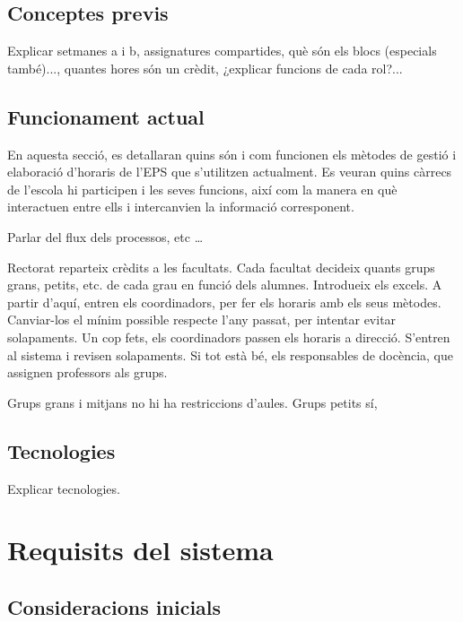 \documentclass[a4paper,12pt]{ThesisStyle}
\begin{document}
\section{Conceptes previs}
\label{sec:conceptes_previs}
Explicar setmanes a i b, assignatures compartides, què són els blocs (especials també)..., quantes hores
són un crèdit, ¿explicar funcions de cada rol?...

\section{Funcionament actual}
\label{sec:funcionament_actual}

En aquesta secció, es detallaran quins són i com funcionen els mètodes de gestió i elaboració d'horaris de l'EPS que s'utilitzen actualment. Es veuran quins càrrecs de l'escola hi participen i les seves funcions, així com la manera en què interactuen entre ells i intercanvien la informació corresponent.

Parlar del flux dels processos, etc \ldots

Rectorat reparteix crèdits a les facultats. Cada facultat decideix quants grups grans, petits, etc. de cada grau en funció dels alumnes. Introdueix els excels.
A partir d'aquí, entren els coordinadors, per fer els horaris amb els seus mètodes. Canviar-los el mínim possible respecte l'any passat, per intentar evitar
solapaments. Un cop fets, els coordinadors passen els horaris a direcció. S'entren al sistema i revisen solapaments. Si tot està bé, els responsables de docència,
que assignen professors als grups.

Grups grans i mitjans no hi ha restriccions d'aules. Grups petits sí,

\section{Tecnologies}
\label{sec:tecnologies}

Explicar tecnologies.

\chapter{Requisits del sistema}
\label{cap:requisits}

\section{Consideracions inicials}
\label{sec:consideracions_inicials}
\end{document}
